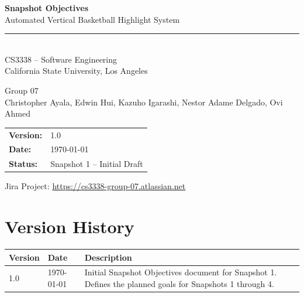 \documentclass[12pt]{article}
\begin{document}
\begin{titlepage}
    \centering
    \vspace*{2cm}

    {\LARGE\bfseries Snapshot Objectives\\[0.5em]}
    {\Large Automated Vertical Basketball Highlight System\\[2em]}

    \rule{\linewidth}{0.5pt}\\[1em]

    {\large CS3338 -- Software Engineering\\
    California State University, Los Angeles\\[1em]}

    {\large Group 07\\[2em]}
    {\normalsize Christopher Ayala, Edwin Hui, Kazuho Igarashi, Nestor Adame Delgado, Ovi Ahmed\\[2em]}

    \begin{tabular}{ll}
        \textbf{Version:}  & 1.0                   \\
        \textbf{Date:}     & \today                \\
        \textbf{Status:}   & Snapshot 1 -- Initial Draft \\
    \end{tabular}

    \vfill
    {\small Jira Project: \href{https://cs3338-group-07.atlassian.net}{https://cs3338-group-07.atlassian.net}}
\end{titlepage}

\newpage
\tableofcontents
\newpage

\section*{Version History}

\begin{longtable}{|p{1in}|p{1.5in}|p{3.5in}|}
\hline
\textbf{Version} & \textbf{Date} & \textbf{Description} \\
\hline
1.0 & \today & Initial Snapshot Objectives document for Snapshot 1. Defines the planned goals for Snapshots 1 through 4. \\
\hline
\end{longtable}
\end{document}
